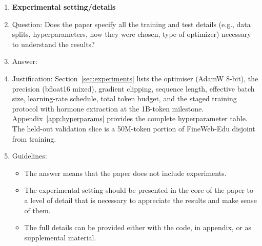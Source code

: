 \begin{enumerate}
\item {\bf Experimental setting/details}
    \item[] Question: Does the paper specify all the training and test details (e.g., data splits, hyperparameters, how they were chosen, type of optimizer) necessary to understand the results?
    \item[] Answer: \answerYes{}
    \item[] Justification: Section~\ref{sec:experiments} lists the optimiser (AdamW 8-bit), the precision (bfloat16 mixed), gradient clipping, sequence length, effective batch size, learning-rate schedule, total token budget, and the staged training protocol with hormone extraction at the 1B-token milestone. Appendix~\ref{app:hyperparams} provides the complete hyperparameter table. The held-out validation slice is a 50M-token portion of FineWeb-Edu disjoint from training.
    \item[] Guidelines:
    \begin{itemize}
        \item The answer \answerNA{} means that the paper does not include experiments.
        \item The experimental setting should be presented in the core of the paper to a level of detail that is necessary to appreciate the results and make sense of them.
        \item The full details can be provided either with the code, in appendix, or as supplemental material.
    \end{itemize}


\end{enumerate}

